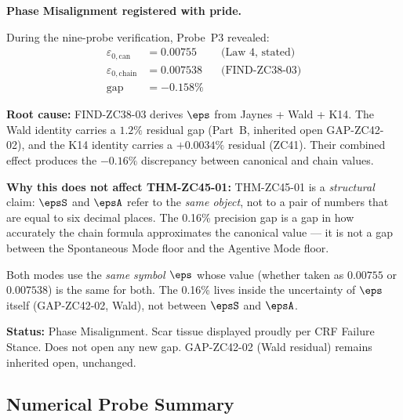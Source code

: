 \documentclass[12pt, a4paper]{article}
\begin{document}
\begin{openqbox}[title={PM-ZC45-01: P3 Scar --- 0.16\% Gap
  Between Canonical $\varepsilon_0$ and Chain Formula
  (Inherited Wald Residual)}]

\textbf{Phase Misalignment registered with pride.}

During the nine-probe verification, Probe~P3 revealed:
\begin{align*}
  \varepsilon_{0,\mathrm{can}} &= 0.00755 &&\text{(Law 4, stated)}\\
  \varepsilon_{0,\mathrm{chain}}     &= 0.007538 &&\text{(FIND-ZC38-03)}\\
  \mathrm{gap}              &= -0.158\%
\end{align*}

\textbf{Root cause:}
FIND-ZC38-03 derives $\eps$ from Jaynes + Wald + K14. The
Wald identity carries a $1.2\%$ residual gap (Part~B,
inherited open GAP-ZC42-02), and the K14 identity carries a
$+0.0034\%$ residual (ZC41). Their combined effect produces
the $-0.16\%$ discrepancy between canonical and chain values.

\textbf{Why this does not affect THM-ZC45-01:}
THM-ZC45-01 is a \emph{structural} claim: $\epsS$ and $\epsA$
refer to the \emph{same object}, not to a pair of numbers
that are equal to six decimal places. The 0.16\% precision
gap is a gap in how accurately the chain formula approximates
the canonical value --- it is not a gap between the
Spontaneous Mode floor and the Agentive Mode floor.

Both modes use the \emph{same symbol $\eps$} whose value
(whether taken as $0.00755$ or $0.007538$) is the same for
both. The 0.16\% lives inside the uncertainty of $\eps$
itself (GAP-ZC42-02, Wald), not between $\epsS$ and $\epsA$.

\textbf{Status:} Phase Misalignment. Scar tissue displayed
proudly per CRF Failure Stance. Does not open any new gap.
GAP-ZC42-02 (Wald residual) remains inherited open,
unchanged.
\end{openqbox}

\subsection{Numerical Probe Summary}

\end{document}
